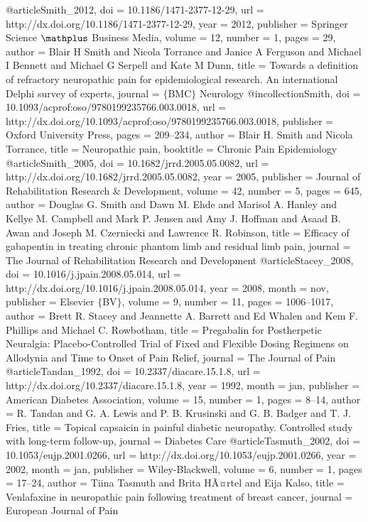 @article{Smith_2012,
	doi = {10.1186/1471-2377-12-29},
	url = {http://dx.doi.org/10.1186/1471-2377-12-29},
	year = 2012,
	publisher = {Springer Science $\mathplus$ Business Media},
	volume = {12},
	number = {1},
	pages = {29},
	author = {Blair H Smith and Nicola Torrance and Janice A Ferguson and Michael I Bennett and Michael G Serpell and Kate M Dunn},
	title = {Towards a definition of refractory neuropathic pain for epidemiological research. An international Delphi survey of experts},
	journal = {$\lbrace$BMC$\rbrace$ Neurology}
}
@incollection{Smith,
	doi = {10.1093/acprof:oso/9780199235766.003.0018},
	url = {http://dx.doi.org/10.1093/acprof:oso/9780199235766.003.0018},
	publisher = {Oxford University Press},
	pages = {209--234},
	author = {Blair H. Smith and Nicola Torrance},
	title = {Neuropathic pain},
	booktitle = {Chronic Pain Epidemiology}
}
@article{Smith_2005,
	doi = {10.1682/jrrd.2005.05.0082},
	url = {http://dx.doi.org/10.1682/jrrd.2005.05.0082},
	year = 2005,
	publisher = {Journal of Rehabilitation Research {\&} Development},
	volume = {42},
	number = {5},
	pages = {645},
	author = {Douglas G. Smith and Dawn M. Ehde and Marisol A. Hanley and Kellye M. Campbell and Mark P. Jensen and Amy J. Hoffman and Asaad B. Awan and Joseph M. Czerniecki and Lawrence R. Robinson},
	title = {Efficacy of gabapentin in treating chronic phantom limb and residual limb pain},
	journal = {The Journal of Rehabilitation Research and Development}
}
@article{Stacey_2008,
	doi = {10.1016/j.jpain.2008.05.014},
	url = {http://dx.doi.org/10.1016/j.jpain.2008.05.014},
	year = 2008,
	month = {nov},
	publisher = {Elsevier $\lbrace$BV$\rbrace$},
	volume = {9},
	number = {11},
	pages = {1006--1017},
	author = {Brett R. Stacey and Jeannette A. Barrett and Ed Whalen and Kem F. Phillips and Michael C. Rowbotham},
	title = {Pregabalin for Postherpetic Neuralgia: Placebo-Controlled Trial of Fixed and Flexible Dosing Regimens on Allodynia and Time to Onset of Pain Relief},
	journal = {The Journal of Pain}
}
@article{Tandan_1992,
	doi = {10.2337/diacare.15.1.8},
	url = {http://dx.doi.org/10.2337/diacare.15.1.8},
	year = 1992,
	month = {jan},
	publisher = {American Diabetes Association},
	volume = {15},
	number = {1},
	pages = {8--14},
	author = {R. Tandan and G. A. Lewis and P. B. Krusinski and G. B. Badger and T. J. Fries},
	title = {Topical capsaicin in painful diabetic neuropathy. Controlled study with long-term follow-up},
	journal = {Diabetes Care}
}
@article{Tasmuth_2002,
	doi = {10.1053/eujp.2001.0266},
	url = {http://dx.doi.org/10.1053/eujp.2001.0266},
	year = 2002,
	month = {jan},
	publisher = {Wiley-Blackwell},
	volume = {6},
	number = {1},
	pages = {17--24},
	author = {Tiina Tasmuth and Brita HÃ¤rtel and Eija Kalso},
	title = {Venlafaxine in neuropathic pain following treatment of breast cancer},
	journal = {European Journal of Pain}
}
